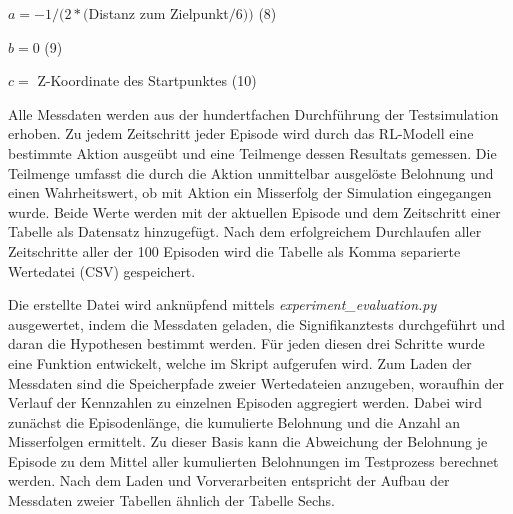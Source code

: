 \begin{description}
    \item \begin{center} $ a = -1 / (2 * ($Distanz zum Zielpunkt$ / 6))$ (8)\end{center}
    \item \begin{center} $ b = 0$ (9)\end{center}
    \item \begin{center} $ c = $ Z-Koordinate des Startpunktes (10)\end{center}
\end{description}

Alle Messdaten werden aus der hundertfachen Durchführung der Testsimulation erhoben.
Zu jedem Zeitschritt jeder Episode wird durch das RL-Modell eine bestimmte Aktion ausgeübt und eine Teilmenge dessen Resultats gemessen.
Die Teilmenge umfasst die durch die Aktion unmittelbar ausgelöste Belohnung und einen Wahrheitswert, ob mit Aktion ein Misserfolg der Simulation eingegangen wurde.
Beide Werte werden mit der aktuellen Episode und dem Zeitschritt einer Tabelle als Datensatz hinzugefügt.
Nach dem erfolgreichem Durchlaufen aller Zeitschritte aller der 100 Episoden wird die Tabelle als Komma separierte Wertedatei (CSV) gespeichert.

Die erstellte Datei wird anknüpfend mittels \textit{experiment\_evaluation.py} ausgewertet, indem die Messdaten geladen, die Signifikanztests durchgeführt und daran die Hypothesen bestimmt werden.
Für jeden diesen drei Schritte wurde eine Funktion entwickelt, welche im Skript aufgerufen wird.
Zum Laden der Messdaten sind die Speicherpfade zweier Wertedateien anzugeben, woraufhin der Verlauf der Kennzahlen zu einzelnen Episoden aggregiert werden.
Dabei wird zunächst die Episodenlänge, die kumulierte Belohnung und die Anzahl an Misserfolgen ermittelt.
Zu dieser Basis kann die Abweichung der Belohnung je Episode zu dem Mittel aller kumulierten Belohnungen im Testprozess berechnet werden. 
Nach dem Laden und Vorverarbeiten entspricht der Aufbau der Messdaten zweier Tabellen ähnlich der Tabelle Sechs.

